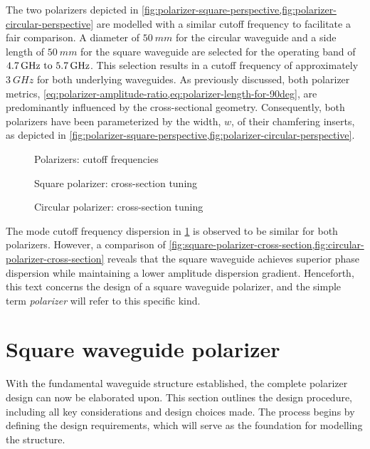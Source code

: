 \documentclass[11pt,a4paper,twoside,openany]{report}
\begin{document}
The two polarizers depicted in \cref{fig:polarizer-square-perspective,fig:polarizer-circular-perspective} are modelled with a similar cutoff frequency to facilitate a fair comparison. A diameter of $\qty{50}{mm}$ for the circular waveguide and a side length of $\qty{50}{mm}$ for the square waveguide are selected for the operating band of $\frequencyrange$. This selection results in a cutoff frequency of approximately $\qty{3}{GHz}$ for both underlying waveguides. As previously discussed, both polarizer metrics, \cref{eq:polarizer-amplitude-ratio,eq:polarizer-length-for-90deg}, are predominantly influenced by the cross-sectional geometry. Consequently, both polarizers have been parameterized by the width, $w$, of their chamfering inserts, as depicted in \cref{fig:polarizer-square-perspective,fig:polarizer-circular-perspective}.

\begin{figure}[!ht]
    \centering
    
    \caption{\label{fig:polarizers-cutoff-frequencies}Polarizers: cutoff frequencies}
\end{figure}

\begin{figure}[!ht]
    \centering
    
    \caption{\label{fig:square-polarizer-cross-section}Square polarizer: cross-section tuning}
\end{figure}

\begin{figure}[!ht]
    \centering
    
    \caption{\label{fig:circular-polarizer-cross-section}Circular polarizer: cross-section tuning}
\end{figure}

The mode cutoff frequency dispersion in \cref{fig:polarizers-cutoff-frequencies} is observed to be similar for both polarizers. However, a comparison of \cref{fig:square-polarizer-cross-section,fig:circular-polarizer-cross-section} reveals that the square waveguide achieves superior phase dispersion while maintaining a lower amplitude dispersion gradient. Henceforth, this text concerns the design of a square waveguide polarizer, and the simple term \emph{polarizer} will refer to this specific kind.

\section{Square waveguide polarizer}
With the fundamental waveguide structure established, the complete polarizer design can now be elaborated upon. This section outlines the design procedure, including all key considerations and design choices made. The process begins by defining the design requirements, which will serve as the foundation for modelling the structure.
\end{document}
